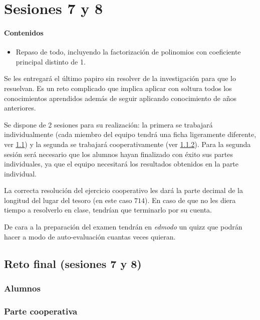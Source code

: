 \section{Sesiones 7 y 8}


\paragraph{Contenidos}
\begin{itemize}
	\item Repaso de todo, incluyendo la factorización de polinomios con coeficiente principal distinto de 1.
\end{itemize}

Se les entregará el último papiro sin resolver de la investigación para que lo resuelvan.
%
Es un reto complicado que implica aplicar con soltura todos los conocimientos aprendidos además de seguir aplicando conocimiento de años anteriores.


Se dispone de 2 sesiones para su realización: la primera se trabajará individualmente (cada miembro del equipo tendrá una ficha ligeramente diferente, ver \ref{ses7:indiv}) y la segunda se trabajará cooperativamente (ver \ref{ses7:coop}).
%
Para la segunda sesión será necesario que los alumnos hayan finalizado con éxito sus partes individuales, ya que el equipo necesitará los resultados obtenidos en la parte individual.

La correcta resolución del ejercicio cooperativo les dará la parte decimal de la longitud del lugar del tesoro (en este caso $714$).
%
En caso de que no les diera tiempo a resolverlo en clase, tendrían que terminarlo por su cuenta.

De cara a la preparación del examen tendrán en \textit{edmodo} un quizz que podrán hacer a modo de auto-evaluación cuantas veces quieran.


\subsection{Reto final (sesiones 7 y 8)}
\label{ses7:indiv}

\subsubsection{Alumnos}



\subsubsection{Parte cooperativa}
\label{ses7:coop}

